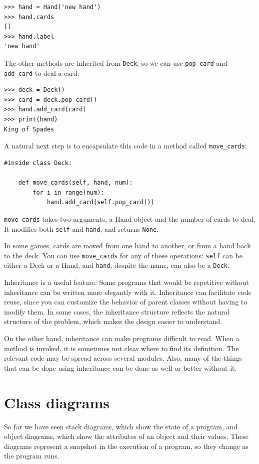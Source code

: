 \documentclass[10pt]{book}
\begin{document}
\begin{verbatim}
>>> hand = Hand('new hand')
>>> hand.cards
[]
>>> hand.label
'new hand'
\end{verbatim}
%
The other methods are inherited from {\tt Deck}, so we can use
\verb"pop_card" and \verb"add_card" to deal a card:

\begin{verbatim}
>>> deck = Deck()
>>> card = deck.pop_card()
>>> hand.add_card(card)
>>> print(hand)
King of Spades
\end{verbatim}
%
A natural next step is to encapsulate this code in a method
called \verb"move_cards":

\begin{verbatim}
#inside class Deck:

    def move_cards(self, hand, num):
        for i in range(num):
            hand.add_card(self.pop_card())
\end{verbatim}
%
\verb"move_cards" takes two arguments, a Hand object and the number of
cards to deal.  It modifies both {\tt self} and {\tt hand}, and
returns {\tt None}.

In some games, cards are moved from one hand to another,
or from a hand back to the deck.  You can use \verb"move_cards"
for any of these operations: {\tt self} can be either a Deck
or a Hand, and {\tt hand}, despite the name, can also be a {\tt Deck}.

Inheritance is a useful feature.  Some programs that would be
repetitive without inheritance can be written more elegantly
with it.  Inheritance can facilitate code reuse, since you can
customize the behavior of parent classes without having to modify
them.  In some cases, the inheritance structure reflects the natural
structure of the problem, which makes the design easier to
understand.

On the other hand, inheritance can make programs difficult to read.
When a method is invoked, it is sometimes not clear where to find its
definition.  The relevant code may be spread across several modules.
Also, many of the things that can be done using inheritance can be
done as well or better without it.


\section{Class diagrams}
\label{class.diagram}

So far we have seen stack diagrams, which show the state of
a program, and object diagrams, which show the attributes
of an object and their values.  These diagrams represent a snapshot
in the execution of a program, so they change as the program
runs.
\end{document}
